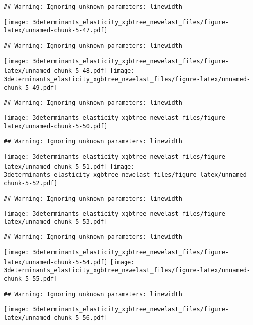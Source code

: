 \documentclass[
]{article}
\begin{document}
\begin{verbatim}
## Warning: Ignoring unknown parameters: linewidth
\end{verbatim}

\texttt{[image: 3determinants\_elasticity\_xgbtree\_newelast\_files/figure-latex/unnamed-chunk-5-47.pdf]}

\begin{verbatim}
## Warning: Ignoring unknown parameters: linewidth
\end{verbatim}

\texttt{[image: 3determinants\_elasticity\_xgbtree\_newelast\_files/figure-latex/unnamed-chunk-5-48.pdf]}
\texttt{[image: 3determinants\_elasticity\_xgbtree\_newelast\_files/figure-latex/unnamed-chunk-5-49.pdf]}

\begin{verbatim}
## Warning: Ignoring unknown parameters: linewidth
\end{verbatim}

\texttt{[image: 3determinants\_elasticity\_xgbtree\_newelast\_files/figure-latex/unnamed-chunk-5-50.pdf]}

\begin{verbatim}
## Warning: Ignoring unknown parameters: linewidth
\end{verbatim}

\texttt{[image: 3determinants\_elasticity\_xgbtree\_newelast\_files/figure-latex/unnamed-chunk-5-51.pdf]}
\texttt{[image: 3determinants\_elasticity\_xgbtree\_newelast\_files/figure-latex/unnamed-chunk-5-52.pdf]}

\begin{verbatim}
## Warning: Ignoring unknown parameters: linewidth
\end{verbatim}

\texttt{[image: 3determinants\_elasticity\_xgbtree\_newelast\_files/figure-latex/unnamed-chunk-5-53.pdf]}

\begin{verbatim}
## Warning: Ignoring unknown parameters: linewidth
\end{verbatim}

\texttt{[image: 3determinants\_elasticity\_xgbtree\_newelast\_files/figure-latex/unnamed-chunk-5-54.pdf]}
\texttt{[image: 3determinants\_elasticity\_xgbtree\_newelast\_files/figure-latex/unnamed-chunk-5-55.pdf]}

\begin{verbatim}
## Warning: Ignoring unknown parameters: linewidth
\end{verbatim}

\texttt{[image: 3determinants\_elasticity\_xgbtree\_newelast\_files/figure-latex/unnamed-chunk-5-56.pdf]}
\end{document}

